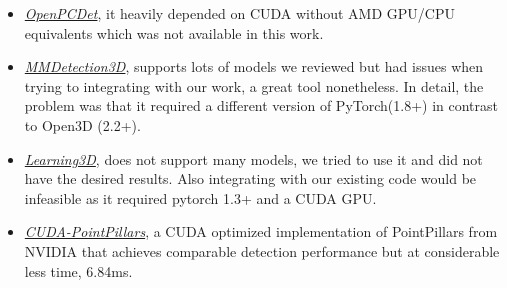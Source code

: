 \begin{itemize}
	\item \href{https://github.com/open-mmlab/OpenPCDet}{\emph{OpenPCDet}}, it heavily depended on CUDA without AMD GPU/CPU equivalents which was not available in this work.
	\item \href{https://github.com/open-mmlab/mmdetection3d}{\emph{MMDetection3D}}, supports lots of models we reviewed but had issues when trying to integrating with our work, a great tool nonetheless. In detail, the problem was that it required a different version of PyTorch(1.8+) in contrast to Open3D (2.2+).
	\item \href{https://github.com/vinits5/learning3d}{\emph{Learning3D}}, does not support many models, we tried to use it and did not have the desired results. Also integrating with our existing code would be infeasible as it required pytorch 1.3+ and a CUDA GPU.
	\item \href{https://github.com/NVIDIA-AI-IOT/CUDA-PointPillars}{\emph{CUDA-PointPillars}}, a CUDA optimized implementation of PointPillars from NVIDIA that achieves comparable detection performance but at considerable less time, 6.84ms.
\end{itemize}
